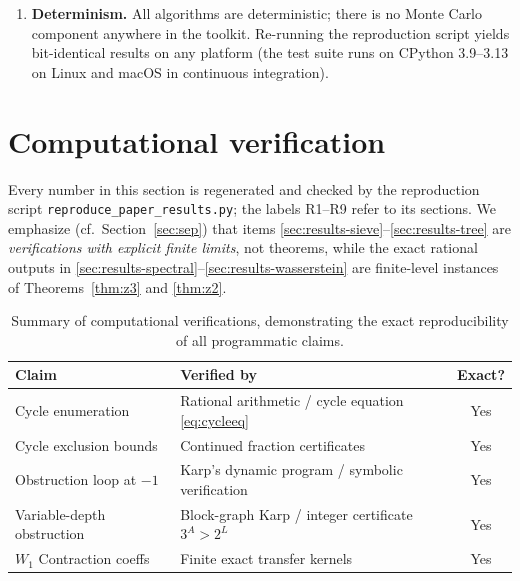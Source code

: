 \documentclass[11pt]{amsart}
\theoremstyle{definition}
\theoremstyle{remark}
\newcommand{\dW}{W_1}
\begin{document}
\begin{enumerate}
\item \textbf{Determinism.} All algorithms are deterministic; there is no Monte Carlo component anywhere in the toolkit. Re-running the reproduction script yields bit-identical results on any platform (the test suite runs on CPython 3.9--3.13 on Linux and macOS in continuous integration).
\end{enumerate}

\section{Computational verification}\label{sec:results}

Every number in this section is regenerated and checked by the reproduction script \texttt{reproduce\_paper\_results.py}; the labels R1--R9 refer to its sections. We emphasize (cf.\ Section~\ref{sec:sep}) that items \ref{sec:results-sieve}--\ref{sec:results-tree} are \emph{verifications with explicit finite limits}, not theorems, while the exact rational outputs in \ref{sec:results-spectral}--\ref{sec:results-wasserstein} are finite-level instances of Theorems~\ref{thm:z3} and \ref{thm:z2}.

\begin{table}[h]
\centering
\begin{tabular}{@{}>{\raggedright\arraybackslash}p{}>{\raggedright\arraybackslash}p{}c@{}}
\toprule
Claim & Verified by & Exact? \\
\midrule
Cycle enumeration & Rational arithmetic / cycle equation \eqref{eq:cycleeq} & Yes \\
Cycle exclusion bounds & Continued fraction certificates & Yes \\
Obstruction loop at $-1$ & Karp's dynamic program / symbolic verification & Yes \\
Variable-depth obstruction & Block-graph Karp / integer certificate $3^A > 2^L$ & Yes \\
$\dW$ Contraction coeffs & Finite exact transfer kernels & Yes \\
\bottomrule
\end{tabular}
\caption{Summary of computational verifications, demonstrating the exact reproducibility of all programmatic claims.}
\label{tab:verification}
\end{table}
\end{document}
